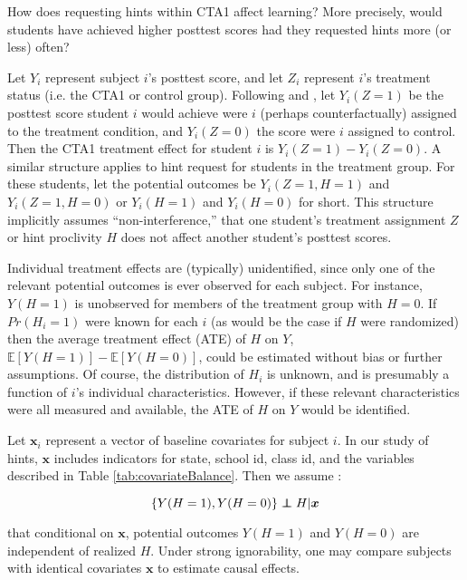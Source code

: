 \documentclass{article}\usepackage[]{graphicx}\usepackage[]{color}
\newcommand{\EE}{\mathbb{E}}
\newenvironment{ass}[2][Assumption:]{\begin{trivlist}
\item[\hskip \labelsep {\bfseries #1}\hskip \labelsep {\bfseries #2}.]}{\end{trivlist}}
\def\independenT#1#2{\mathrel{\rlap{$#1#2$}\mkern2mu{#1#2}}}
\newcommand\independent{\protect\mathpalette{\protect\independenT}{\perp}}
\begin{document}
How does requesting hints within CTA1 affect learning?
More precisely, would students have achieved higher posttest scores
had they requested hints more (or less) often?

Let $Y_i$ represent subject $i$'s posttest score, and let $Z_i$ represent
$i$'s treatment status (i.e. the CTA1 or control group).
Following \citet{neyman} and \citet{rubin}, let $Y_i(Z=1)$ be
the posttest score student $i$ would achieve were $i$ (perhaps
counterfactually) assigned to the treatment condition, and
$Y_i(Z=0)$ the score were $i$ assigned to control.
Then the CTA1 treatment effect for student $i$ is $Y_i(Z=1)-Y_i(Z=0)$.
A similar structure applies to hint request for students in the
treatment group.
For these students, let the potential outcomes be $Y_i(Z=1,H=1)$ and
$Y_i(Z=1,H=0)$ or $Y_i(H=1)$ and $Y_i(H=0)$ for short.
This structure implicitly assumes ``non-interference,'' that one
student's treatment assignment $Z$ or hint proclivity $H$ does not
affect another student's posttest scores.

Individual treatment effects are (typically) unidentified, since only
one of the relevant potential outcomes is ever observed for each
subject.
For instance, $Y(H=1)$ is unobserved for members of the
treatment group with $H=0$.
If $Pr(H_i=1)$ were known for each $i$ (as would be the case if $H$
were randomized) then the average treatment effect (ATE) of $H$ on $Y$,
$\EE[Y(H=1)]-\EE[Y(H=0)]$, could be estimated without bias or further
assumptions.
Of course, the distribution of $H_i$ is unknown, and is presumably a
function of $i$'s individual characteristics.
However, if these relevant characteristics were all measured and
available, the ATE of $H$ on $Y$ would be identified.

Let $\bm{x}_i$ represent a vector of baseline covariates for subject $i$.
In our study of hints, $\bm{x}$ includes indicators for state, school
id, class id, and the variables described in Table \ref{tab:covariateBalance}.
Then we assume \citep[c.f.][]{rosenbaum1983central}:
\begin{ass}{Strong Ignorability}
\begin{equation*}
 \{Y(H=1),Y(H=0)\}\independent H |\bm{x}
\end{equation*}
\end{ass}
that conditional on $\bm{x}$, potential outcomes $Y(H=1)$ and $Y(H=0)$
are independent of realized $H$.
Under strong ignorability, one may compare subjects with identical
covariates $\bm{x}$ to estimate causal effects.
\end{document}
